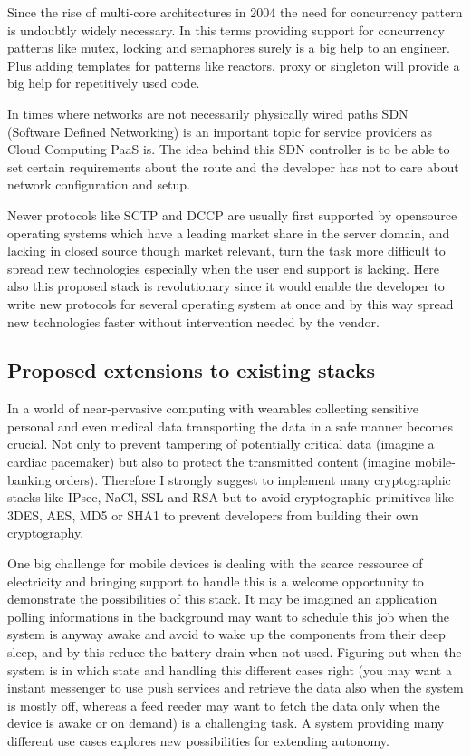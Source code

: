 \documentclass[twocolumn,english]{IEEEtran}
\theoremstyle{plain}
\theoremstyle{plain}
\begin{document}
Since the rise of multi-core architectures in
2004\cite{amd:first-multicore-x86} the need for concurrency pattern is
undoubtly widely necessary. In this terms providing support for concurrency
patterns like mutex, locking and semaphores surely is a big help to an
engineer. Plus adding templates for patterns like reactors, proxy or singleton
will provide a big help for repetitively used code.

In times where networks are not necessarily physically wired paths SDN
(Software Defined Networking) is an important topic for service providers as
Cloud Computing PaaS is. The idea behind this SDN controller is to be able to
set certain requirements about the route and the developer has not to care
about network configuration and setup.

Newer protocols like SCTP and DCCP are usually first supported by opensource
operating systems which have a leading market share in the server
domain\cite{w3techs:os-web}, and lacking in closed source though market
relevant, turn the task more difficult to spread new technologies especially
when the user end support is lacking\cite{netmarketshare:desktop-os}. Here
also this proposed stack is revolutionary since it would enable the developer
to write new protocols for several operating system at once and by this way
spread new technologies faster without intervention needed by the vendor.

\subsection{Proposed extensions to existing stacks}

In a world of near-pervasive computing with wearables collecting sensitive
personal and even medical data transporting the data in a safe manner becomes
crucial. Not only to prevent tampering of potentially critical data (imagine a
cardiac pacemaker) but also to protect the transmitted content (imagine
mobile-banking orders). Therefore I strongly suggest to implement many
cryptographic stacks like IPsec, NaCl, SSL and RSA but to avoid cryptographic
primitives like 3DES, AES, MD5 or SHA1 to prevent developers from building
their own cryptography.

One big challenge for mobile devices is dealing with the scarce ressource of
electricity and bringing support to handle this is a welcome opportunity to
demonstrate the possibilities of this stack. It may be imagined an application
polling informations in the background may want to schedule this job when the
system is anyway awake and avoid to wake up the components from their deep
sleep, and by this reduce the battery drain when not used. Figuring out when
the system is in which state and handling this different cases right (you may
want a instant messenger to use push services and retrieve the data also when
the system is mostly off, whereas a feed reeder may want to fetch the data
only when the device is awake or on demand) is a challenging task. A system
providing many different use cases explores new possibilities for extending
autonomy.
\end{document}
